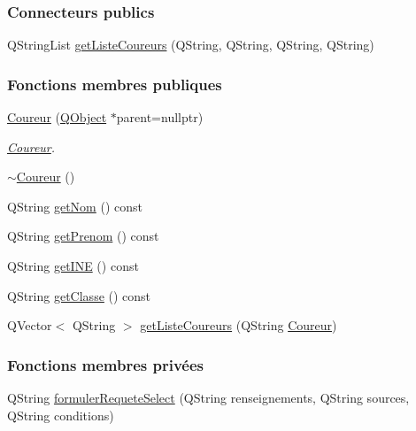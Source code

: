 \subsubsection*{Connecteurs publics}
\begin{DoxyCompactItemize}
\item 
Q\+String\+List \hyperlink{class_coureur_a99e640aba229bb629e894729413b4e84}{get\+Liste\+Coureurs} (Q\+String, Q\+String, Q\+String, Q\+String)
\end{DoxyCompactItemize}
\subsubsection*{Fonctions membres publiques}
\begin{DoxyCompactItemize}
\item 
\hyperlink{class_coureur_af3a5607d96a0960b1666164f6a74d539}{Coureur} (\hyperlink{class_q_object}{Q\+Object} $\ast$parent=nullptr)
\begin{DoxyCompactList}\small\item\em \hyperlink{class_coureur}{Coureur}. \end{DoxyCompactList}\item 
\hyperlink{class_coureur_acbaa69246e4da18c0951f651f9ab3d69}{$\sim$\+Coureur} ()
\item 
Q\+String \hyperlink{class_coureur_a1808f13910638c6f2a57e87be522adf3}{get\+Nom} () const
\item 
Q\+String \hyperlink{class_coureur_a54a92a0fcaf7db9079f9d3f5d043539c}{get\+Prenom} () const
\item 
Q\+String \hyperlink{class_coureur_a724d13c5c34757fcd70491da44a918e3}{get\+I\+NE} () const
\item 
Q\+String \hyperlink{class_coureur_aa611e208767c4db4999e00296aa12632}{get\+Classe} () const
\item 
Q\+Vector$<$ Q\+String $>$ \hyperlink{class_coureur_a1d9f2cb15f74ff1c7b20fde081b5c5d6}{get\+Liste\+Coureurs} (Q\+String \hyperlink{class_coureur}{Coureur})
\end{DoxyCompactItemize}
\subsubsection*{Fonctions membres privées}
\begin{DoxyCompactItemize}
\item 
Q\+String \hyperlink{class_coureur_ad46f9151c1d00fbddb31c352ba331d78}{formuler\+Requete\+Select} (Q\+String renseignements, Q\+String sources, Q\+String conditions)
\end{DoxyCompactItemize}
